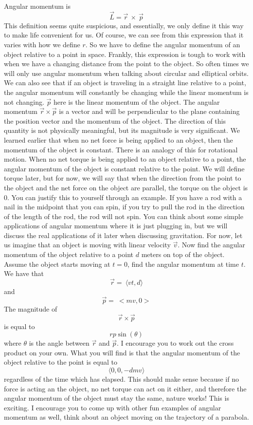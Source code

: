\documentclass{article}[gray]
\numberwithin{equation}{subsection}
\begin{document}
Angular momentum is \begin{equation}\vec{L} = \vec{r} \ \times \ \vec{p}\end{equation} This definition seems quite suspicious, and essentially, we only define it this way to make life convenient for us. Of course, we can see from this expression that it varies with how we define $r$. So we have to define the angular momentum of an object relative to a point in space. Frankly, this expression is tough to work with when we have a changing distance from the point to the object. So often times we will only use angular momentum when talking about circular and elliptical orbits. We can also see that if an object is traveling in a straight line relative to a point, the angular momentum will constantly be changing while the linear momentum is not changing. $\vec{p}$ here is the linear momentum of the object. The angular momentum $\vec{r} \times \vec{p}$ is a vector and will be perpendicular to the plane containing the position vector and the momentum of the object. The direction of this quantity is not physically meaningful, but its magnitude is very significant. We learned earlier that when no net force is being applied to an object, then the momentum of the object is constant. There is an analogy of this for rotational motion. When no net torque is being applied to an object relative to a point, the angular momentum of the object is constant relative to the point. We will define torque later, but for now, we will say that when the direction from the point to the object and the net force on the object are parallel, the torque on the object is 0. You can justify this to yourself through an example. If you have a rod with a nail in the midpoint that you can spin, if you try to pull the rod in the direction of the length of the rod, the rod will not spin. You can think about some simple applications of angular momentum where it is just plugging in, but we will discuss the real applications of it later when discussing gravitation. For now, let us imagine that an object is moving with linear velocity $\vec{v}$. Now find the angular momentum of the object relative to a point $d$ meters on top of the object. Assume the object starts moving at $t=0$, find the angular momentum at time $t$. We have that $$\vec{r}= \ \langle vt,d \rangle $$ and $$\vec{p}= \ <mv,0>$$ The magnitude of  $$\vec{r} \times \vec{p}$$ is equal to $$rp\sin\left(\theta \right)$$ where $\theta$ is the angle between $\vec{r}$ and $\vec{p}$. I encourage you to work out the cross product on your own. What you will find is that the angular momentum of the object relative to the point is equal to $$\langle 0,0,-dmv \rangle$$ regardless of the time which has elapsed. This should make sense because if no force is acting an the object, no net torque can act on it either, and therefore the angular momentum of the object must stay the same, nature works! This is exciting. I encourage you to come up with other fun examples of angular momentum as well, think about an object moving on the trajectory of a parabola. 
\end{document}
